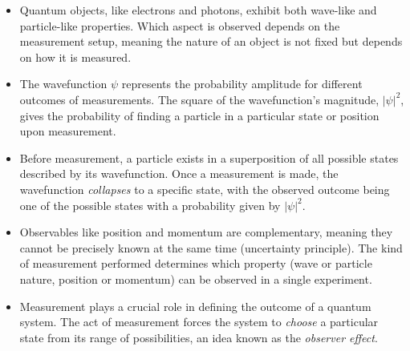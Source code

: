 \begin{itemize}
	\item Quantum objects, like electrons and photons, exhibit both wave-like and particle-like properties. Which aspect is observed depends on the measurement setup, meaning the nature of an object is not fixed but depends on how it is measured.
	\item The wavefunction $\psi$ represents the probability amplitude for different outcomes of measurements. The square of the wavefunction's magnitude, $|\psi|^2$, gives the probability of finding a particle in a particular state or position upon measurement.
	\item Before measurement, a particle exists in a superposition of all possible states described by its wavefunction. Once a measurement is made, the wavefunction \textit{collapses} to a specific state, with the observed outcome being one of the possible states with a probability given by $|\psi|^2$.
	\item Observables like position and momentum are complementary, meaning they cannot be precisely known at the same time (uncertainty principle). The kind of measurement performed determines which property (wave or particle nature, position or momentum) can be observed in a single experiment.
	\item Measurement plays a crucial role in defining the outcome of a quantum system. The act of measurement forces the system to \textit{choose} a particular state from its range of possibilities, an idea known as the \textit{observer effect}.
\end{itemize} 

